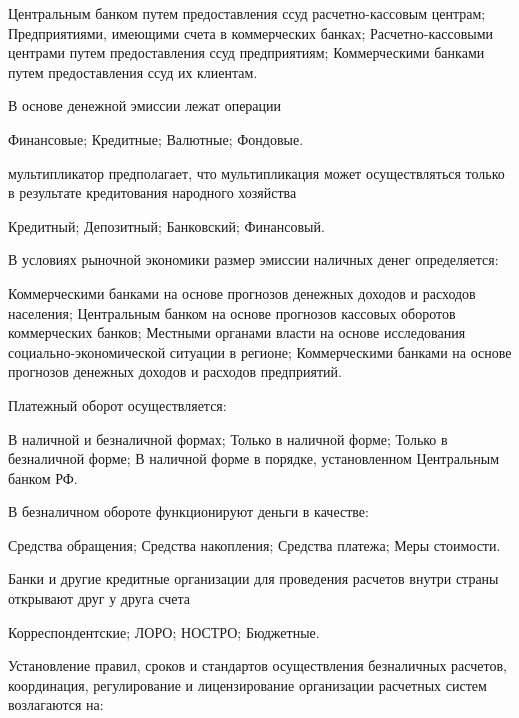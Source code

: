 \documentclass[12pt, table]{exam}
\begin{document}
\begin{questions}
\begin{multicols}{2}
	 \begin{choices}
	 \choice Центральным банком путем предоставления ссуд расчетно-кассовым центрам;
	 \choice Предприятиями, имеющими счета в коммерческих банках;
	 \choice Расчетно-кассовыми центрами путем предоставления ссуд предприятиям;
	 \CC Коммерческими банками путем предоставления ссуд их клиентам.
	 \end{choices}
\question В основе денежной эмиссии лежат операции
	 \begin{choices}
	 \choice Финансовые;
	 \choice Кредитные;
	 \CC Валютные;
	 \choice Фондовые.
	 \end{choices}
\question  мультипликатор предполагает, что мультипликация может осуществляться только в результате кредитования народного хозяйства
	 \begin{choices}
	 \CC Кредитный;
	 \choice Депозитный;
	 \choice Банковский;
	 \choice Финансовый.
	 \end{choices}
\question В условиях рыночной экономики размер эмиссии наличных денег определяется:
	 \begin{choices}
	 \choice Коммерческими банками на основе прогнозов денежных доходов и расходов населения;
	 \CC Центральным банком на основе прогнозов кассовых оборотов коммерческих банков;
	 \choice Местными органами власти на основе исследования социально-экономической ситуации в регионе;
	 \choice Коммерческими банками на основе прогнозов денежных доходов и расходов предприятий.
	 \end{choices}
\question Платежный оборот осуществляется:
	 \begin{choices}
	 \CC В наличной и безналичной формах;
	 \choice Только в наличной форме;
	 \choice Только в безналичной форме;
	 \choice В наличной форме в порядке, установленном Центральным банком РФ.
	 \end{choices}
\question В безналичном обороте функционируют деньги в качестве:
	 \begin{choices}
	 \choice Средства обращения;
	 \choice Средства накопления;
	 \choice Средства платежа;
	 \CC Меры стоимости.
	 \end{choices}
\question Банки и другие кредитные организации для проведения расчетов внутри страны открывают друг у друга  счета
	 \begin{choices}
	 \choice Корреспондентские;
	 \CC ЛОРО;
	 \choice НОСТРО;
	 \choice Бюджетные.
	 \end{choices}
\question Установление правил, сроков и стандартов осуществления безналичных расчетов, координация, регулирование и лицензирование организации расчетных систем возлагаются на:

\end{multicols}
\end{questions}
\end{document}

